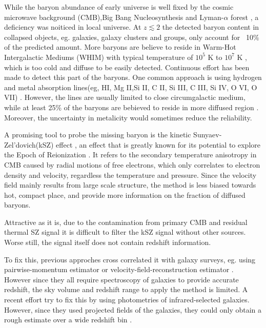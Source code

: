 While the baryon abundance of early universe is well fixed by the cosmic microwave background (CMB),Big Bang Nucleosynthesis and Lyman-$\alpha$ forest \cite{Cooke14}\cite{Fukugita98}\cite{Komatsu11}\cite{Hinshaw13}, 
a deficiency was noiticed in local universe.
At $z\lesssim 2$ the detected baryon content in collapsed
objects, eg. galaxies, galaxy clusters and groups, only account for ~10$\%$ of the predicted amount.
More baryons are believe to reside in Warm-Hot Intergalactic Mediums (WHIM) with typical temperature of $10^5$ K to $10^7$ K \cite{Soltan06}, which is too cold and diffuse to be easily detected.
Continuous effort has been made to detect this part of the baryons. 
One common approach is using hydrogen and metal absorption lines(eg, HI, Mg II,Si II, C II, Si III, C III, Si IV, O VI, O VII) \cite{Fukugita04}\cite{Werk14}.
However, the lines are usually limited to close circumgalactic medium, while at least 25\% of the baryons are bebieved to reside in more diffused region \cite{Dave10}. Moreover, the uncertainty in metalicity would sometimes reduce the reliability.

A promising tool to probe the missing baryon is the kinetic Sunyaev-Zel'dovich(kSZ) effect \cite{Sunyaev72}\cite{Sunyaev80}, 
  an effect that is greatly known for its potential to explore the Epoch of Reionization \cite{Zhang04}\cite{McQuinn05}\cite{Zahn12}. 
It refers to the secondary temperature anisotropy in CMB caused by radial motions of free electrons, 
  which only correlates to electron density and velocity, 
regardless the temperature and pressure. 
Since the velocity field mainly results from large scale structure, 
the method is less biased towards hot, compact place, 
and provide more information on the fraction of diffused baryons.

Attractive as it is, 
due to the contamination from primary CMB and residual thermal SZ signal
it is difficult to filter the kSZ signal without other sources. 
Worse still, the signal itself does not contain redshift information.

To fix this, previous approches cross correlated it with galaxy surveys, 
eg. using pairwise-momentum estimator \cite{Hand12} or velocity-field-reconstruction estimator \cite{Shao11}\cite{Li14}. 
However since they all require spectroscopy of galaxies to provide accurate redshift, the sky volume and redshift range to apply the method is limited. 
A recent effort try to fix this by using photometries of infrared-selected galaxies. 
However, since they used projected fields of the galaxies, they could only obtain a rough estimate over a wide redshift bin \cite{Hill16}.

